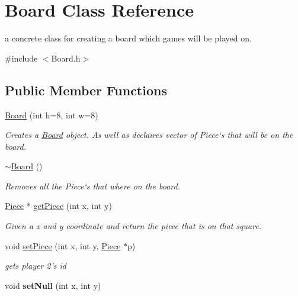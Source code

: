 \hypertarget{classBoard}{
\section{Board Class Reference}
\label{classBoard}
}


a concrete class for creating a board which games will be played on.  


{\ttfamily \#include $<$Board.h$>$}\subsection*{Public Member Functions}
\begin{DoxyCompactItemize}
\item 
\hypertarget{classBoard_a8bbcd997b4099120e7427e06fd6a103f}{
\hyperlink{classBoard_a8bbcd997b4099120e7427e06fd6a103f}{Board} (int h=8, int w=8)}
\label{classBoard_a8bbcd997b4099120e7427e06fd6a103f}

\begin{DoxyCompactList}\small\item\em Creates a \hyperlink{classBoard}{Board} object. As well as declaires vector of Piece`s that will be on the board. \item\end{DoxyCompactList}\item 
\hypertarget{classBoard_af73f45730119a1fd8f6670f53f959e68}{
\hyperlink{classBoard_af73f45730119a1fd8f6670f53f959e68}{$\sim$Board} ()}
\label{classBoard_af73f45730119a1fd8f6670f53f959e68}

\begin{DoxyCompactList}\small\item\em Removes all the Piece`s that where on the board. \item\end{DoxyCompactList}\item 
\hyperlink{classPiece}{Piece} $\ast$ \hyperlink{classBoard_a80649196225f3e7da030b56a9bf19f64}{getPiece} (int x, int y)
\begin{DoxyCompactList}\small\item\em Given a x and y coordinate and return the piece that is on that square. \item\end{DoxyCompactList}\item 
void \hyperlink{classBoard_a4eca4cabd2a51a2095917b203fecbe0c}{setPiece} (int x, int y, \hyperlink{classPiece}{Piece} $\ast$p)
\begin{DoxyCompactList}\small\item\em gets player 2's id \item\end{DoxyCompactList}\item 
\hypertarget{classBoard_a888c8ce1bb6a4cede9fc54070de91fe5}{
void {\bfseries setNull} (int x, int y)}
\label{classBoard_a888c8ce1bb6a4cede9fc54070de91fe5}


\end{DoxyCompactItemize}
